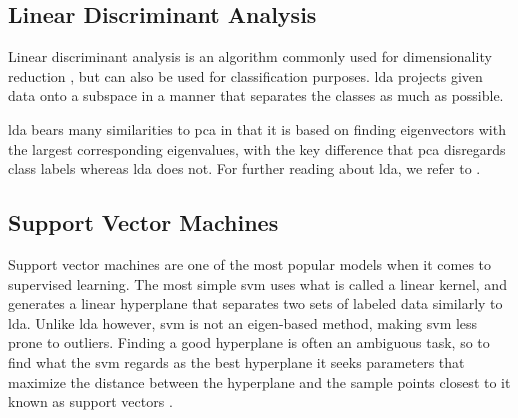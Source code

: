 


\subsection{Linear Discriminant Analysis}

Linear discriminant analysis is an algorithm commonly used for dimensionality reduction \citep{raschka_2014}, but can also be used for classification purposes. \gls{lda} projects given data onto a subspace in a manner that separates the classes as much as possible. 

\gls{lda} bears many similarities to \gls{pca} in that it is based on finding eigenvectors with the largest corresponding eigenvalues, with the key difference that \gls{pca} disregards class labels whereas \gls{lda} does not. For further reading about \gls{lda}, we refer to \citep{raschka_2014}.



\subsection{Support Vector Machines}

Support vector machines are one of the most popular models when it comes to supervised learning. The most simple \gls{svm} uses what is called a linear kernel, and generates a linear hyperplane that separates two sets of labeled data similarly to \gls{lda}. Unlike \gls{lda} however, \gls{svm} is not an eigen-based method, making \gls{svm} less prone to outliers. Finding a good hyperplane is often an ambiguous task, so to find what the \gls{svm} regards as the best hyperplane it seeks parameters that maximize the distance between the hyperplane and the sample points closest to it known as support vectors \citep{boswell_2002}. 


